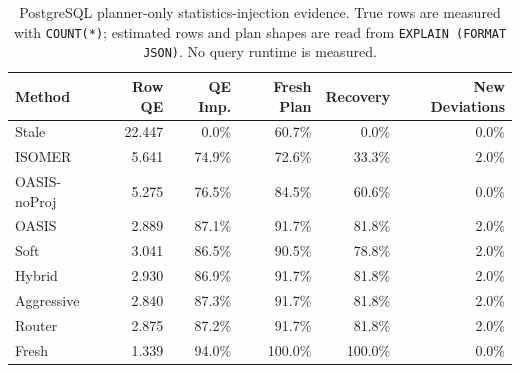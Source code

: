 \begin{table}[t]
  \centering
  \small
  \caption{PostgreSQL planner-only statistics-injection evidence. True rows are measured with \texttt{COUNT(*)}; estimated rows and plan shapes are read from \texttt{EXPLAIN (FORMAT JSON)}. No query runtime is measured.}
  \label{tab:postgres_planner_stats_injection}
  \setlength{\tabcolsep}{4pt}
  \begin{tabular}{lrrrrr}
    \toprule
    Method & Row QE & QE Imp. & Fresh Plan & Recovery & New Deviations \\
    \midrule
    Stale & 22.447 & 0.0\% & 60.7\% & 0.0\% & 0.0\% \\
    ISOMER & 5.641 & 74.9\% & 72.6\% & 33.3\% & 2.0\% \\
    OASIS-noProj & 5.275 & 76.5\% & 84.5\% & 60.6\% & 0.0\% \\
    OASIS & 2.889 & 87.1\% & 91.7\% & 81.8\% & 2.0\% \\
    Soft & 3.041 & 86.5\% & 90.5\% & 78.8\% & 2.0\% \\
    Hybrid & 2.930 & 86.9\% & 91.7\% & 81.8\% & 2.0\% \\
    Aggressive & 2.840 & 87.3\% & 91.7\% & 81.8\% & 2.0\% \\
    Router & 2.875 & 87.2\% & 91.7\% & 81.8\% & 2.0\% \\
    Fresh & 1.339 & 94.0\% & 100.0\% & 100.0\% & 0.0\% \\
    \bottomrule
  \end{tabular}
\end{table}
